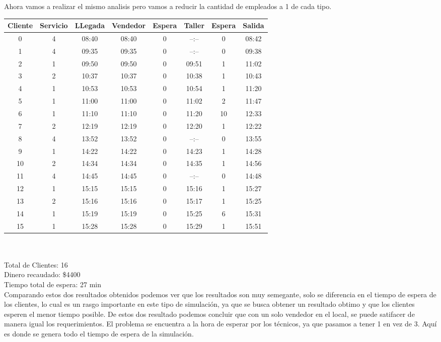 \documentclass[12pt]{article}
\begin{document}
Ahora vamos a realizar el mismo analisis pero vamos a reducir la cantidad de empleados a 1 de cada tipo.\\
\begin{tabular}{|c|c|c|c|c|c|c|c|}
\hline
Cliente & Servicio & LLegada & Vendedor & Espera & Taller & Espera & Salida \\
\hline
0&4 & 08:40 & 08:40 & 0 & --:-- & 0 & 08:42\\
1&4 & 09:35 & 09:35 & 0 & --:-- & 0 & 09:38\\
2&1 & 09:50 & 09:50 & 0 & 09:51 & 1 & 11:02\\
3&2 & 10:37 & 10:37 & 0 & 10:38 & 1 & 10:43\\
4&1 & 10:53 & 10:53 & 0 & 10:54 & 1 & 11:20\\
5&1 & 11:00 & 11:00 & 0 & 11:02 & 2 & 11:47\\
6&1 & 11:10 & 11:10 & 0 & 11:20 & 10 & 12:33\\
7&2 & 12:19 & 12:19 & 0 & 12:20 & 1 & 12:22\\
8&4 & 13:52 & 13:52 & 0 & --:-- & 0 & 13:55\\
9&1 & 14:22 & 14:22 & 0 & 14:23 & 1 & 14:28\\
10&2 & 14:34 & 14:34 & 0 & 14:35 & 1 & 14:56\\
11&4 & 14:45 & 14:45 & 0 & --:-- & 0 & 14:48\\
12&1 & 15:15 & 15:15 & 0 & 15:16 & 1 & 15:27\\
13&2 & 15:16 & 15:16 & 0 & 15:17 & 1 & 15:25\\
14&1 & 15:19 & 15:19 & 0 & 15:25 & 6 & 15:31\\
15&1 & 15:28 & 15:28 & 0 & 15:29 & 1 & 15:51\\
\hline
\end{tabular}\\
\\

\noindent Total de Clientes: 16\\
Dinero recaudado: \$4400\\
Tiempo total de espera: 27 min\\

Comparando estos dos resultados obtenidos podemos ver que los resultados son muy semegante, solo se diferencia en el tiempo de espera de los clientes, lo cual es un rasgo importante en este tipo de simulaci\'on, ya que se busca obtener un resultado obtimo y que los clientes esperen el menor tiempo posible. De estos dos resultado podemos concluir que con un solo vendedor en el local, se puede satifacer de manera igual los requerimientos. El problema se encuentra a la hora de esperar por los t\'ecnicos, ya que pasamos a tener 1 en vez de 3. Aqu\'i es donde se genera todo el tiempo de espera de la simulaci\'on.
\end{document}
